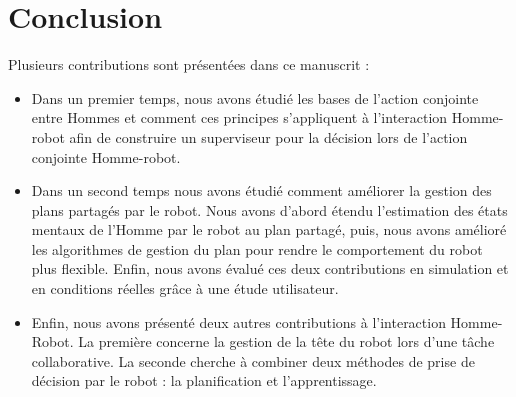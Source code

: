 \documentclass[english,a4paper,11pt,twoside]{StyleThese}
\begin{document}
\newpage
\section{Conclusion}

Plusieurs contributions sont présentées dans ce manuscrit :
\begin{itemize}
\item Dans un premier temps, nous avons étudié les bases de l'action conjointe entre Hommes et comment ces principes s'appliquent à l'interaction Homme-robot afin de construire un superviseur pour la décision lors de l'action conjointe Homme-robot. 
\item Dans un second temps nous avons étudié comment améliorer la gestion des plans partagés par le robot. Nous avons d'abord étendu l'estimation des états mentaux de l'Homme par le robot au plan partagé, puis, nous avons amélioré les algorithmes de gestion du plan pour rendre le comportement du robot plus flexible. Enfin, nous avons évalué ces deux contributions en simulation et en conditions réelles grâce à une étude utilisateur.
\item Enfin, nous avons présenté deux autres contributions à l'interaction Homme-Robot. La première concerne la gestion de la tête du robot lors d'une tâche collaborative. La seconde cherche à combiner deux méthodes de prise de décision par le robot : la planification et l'apprentissage.
\end{itemize}


\ifdefined{}
\else


\end{document}
